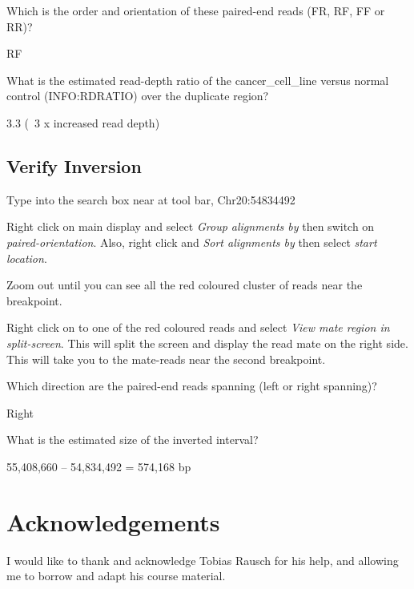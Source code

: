 \begin{questions}
Which is the order and orientation of these paired-end reads (FR, RF, FF or RR)? 
\begin{answer}
RF
\end{answer}
What is the estimated read-depth ratio of the cancer\_cell\_line versus normal control (INFO:RDRATIO) over the duplicate region? 
\begin{answer}
3.3 (~3 x increased read depth) 
\end{answer}
\end{questions}


\subsection{Verify Inversion}
\begin{advanced}
\begin{steps}

Type into the search box near at tool bar, Chr20:54834492 

Right click on main display and select \emph{Group alignments by} then switch on \emph{paired-orientation}. Also, right click and \emph{Sort alignments by} then select \emph{start location}. 

Zoom out until you can see all the red coloured cluster of reads near the breakpoint. 

Right click on to one of the red coloured reads and select \emph{View mate region in split-screen}. This will split the screen and display the read mate on the right side. This will take you to the mate-reads near the second breakpoint. 
\end{steps}
\end{advanced}


\begin{questions}
Which direction are the paired-end reads spanning (left or right spanning)?  
\begin{answer}
Right
\end{answer}
What is the estimated size of the inverted interval? 
\begin{answer}
55,408,660 – 54,834,492 = 574,168 bp
\end{answer}
\end{questions}

\section{Acknowledgements}

I would like to thank and acknowledge Tobias Rausch for his help, and allowing me to borrow and adapt his course material. 


